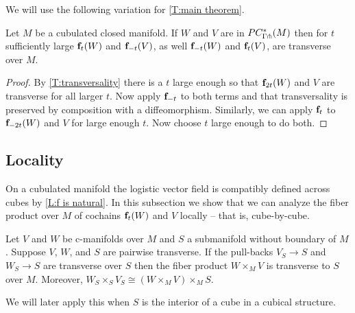 We will use the following variation for \cref{T:main theorem}.

\begin{corollary}\label{C:transversality}
	Let $M$ be a cubulated closed manifold.
	If $W$ and $V$ are in $PC_{\Gamma \pitchfork}^*(M)$ then for $t$ sufficiently large $\mathbf{f}_t(W)$ and $\mathbf{f}_{-t}(V)$, as well $\mathbf{f}_{-t}(W)$ and $\mathbf{f}_t(V)$, are transverse over $M$.
\end{corollary}

\begin{proof}
	By \cref{T:transversality} there is a $t$ large enough so that $\mathbf{f}_{2t}(W)$ and $V$ are transverse for all larger $t$.
	Now apply $\mathbf{f}_{-t}$ to both terms and that transversality is preserved by composition with a diffeomorphism.
	Similarly, we can apply $\mathbf{f}_t$ to $\mathbf{f}_{-2t}(W)$ and $V$ for large enough $t$.
	Now choose $t$ large enough to do both.
\end{proof}

\subsection{Locality}\label{S: locality}

On a cubulated manifold the logistic vector field is compatibly defined across cubes by \cref{L:f is natural}.
In this subsection we show that we can analyze the fiber product over $M$ of cochains $\mathbf{f}_t(W)$ and $V$ locally -- that is, cube-by-cube.

\begin{lemma}\label{L:little trans lemma}
	Let $V$ and $W$ be c-manifolds over $M$ and $S$ a submanifold without boundary of $M$.
	Suppose $V$, $W$, and $S$ are pairwise transverse.
	If the pull-backs $V_S \to S$ and $W_S \to S$ are transverse over $S$ then the fiber product $W \times_M V$ is transverse to $S$ over $M$.
	Moreover, $W_S \times_S V_S \cong (W \times_M V) \times_M S$.
\end{lemma}

We will later apply this when $S$ is the interior of a cube in a cubical structure.

